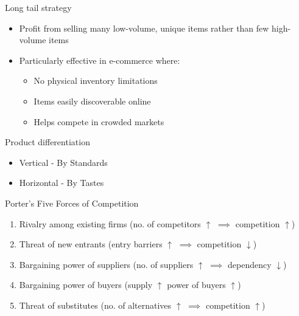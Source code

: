 \begin{theorem}
    {Long tail strategy}
    \begin{itemize}
        \item Profit from selling many low-volume, unique items rather than few high-volume items
        \item Particularly effective in e-commerce where:
              \begin{itemize}
                  \item No physical inventory limitations
                  \item Items easily discoverable online
                  \item Helps compete in crowded markets
              \end{itemize}
    \end{itemize}
\end{theorem}

\begin{theorem}
    {Product differentiation}
    \begin{itemize}
        \item Vertical - By Standards
        \item Horizontal - By Tastes
    \end{itemize}
\end{theorem}

\begin{theorem}
    {Porter's Five Forces of Competition}
    \begin{enumerate}
        \item Rivalry among existing firms (no. of competitors $\uparrow$ $\implies$ competition $\uparrow$)
        \item Threat of new entrants (entry barriers $\uparrow$ $\implies$ competition $\downarrow$)
        \item Bargaining power of suppliers (no. of suppliers $\uparrow$ $\implies$ dependency $\downarrow$)
        \item Bargaining power of buyers (supply $\uparrow$ power of buyers $\uparrow$)
        \item Threat of substitutes (no. of alternatives $\uparrow$ $\implies$ competition $\uparrow$)
    \end{enumerate}
\end{theorem}
